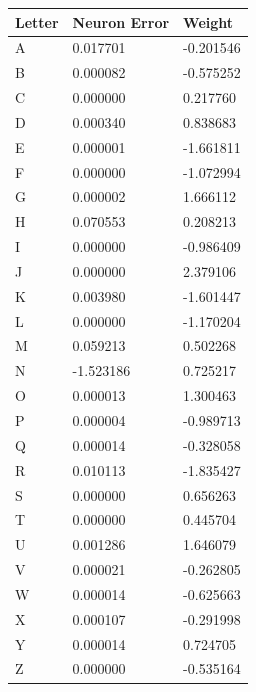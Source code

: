 \documentclass{article}
\begin{document}
\begin{enumerate}
    \begin{table}[H]
        \centering
        \begin{tabularx}{\textwidth}{|L|L|L|}
            \hline
            \textbf{Letter} & \textbf{Neuron Error} & \textbf{Weight} \\\hline
            A & 0.017701 & -0.201546 \\
            B & 0.000082 & -0.575252 \\
            C & 0.000000 & 0.217760 \\
            D & 0.000340 & 0.838683 \\
            E & 0.000001 & -1.661811 \\
            F & 0.000000 & -1.072994 \\
            G & 0.000002 & 1.666112 \\
            H & 0.070553 & 0.208213 \\
            I & 0.000000 & -0.986409 \\
            J & 0.000000 & 2.379106 \\
            K & 0.003980 & -1.601447 \\
            L & 0.000000 & -1.170204 \\
            M & 0.059213 & 0.502268 \\
            N & -1.523186 & 0.725217 \\
            O & 0.000013 & 1.300463 \\
            P & 0.000004 & -0.989713 \\
            Q & 0.000014 & -0.328058 \\
            R & 0.010113 & -1.835427 \\
            S & 0.000000 & 0.656263 \\
            T & 0.000000 & 0.445704 \\
            U & 0.001286 & 1.646079 \\
            V & 0.000021 & -0.262805 \\
            W & 0.000014 & -0.625663 \\
            X & 0.000107 & -0.291998 \\
            Y & 0.000014 & 0.724705 \\
            Z & 0.000000 & -0.535164 \\\hline    
        \end{tabularx}
    \end{table}

\end{enumerate}
\end{document}
